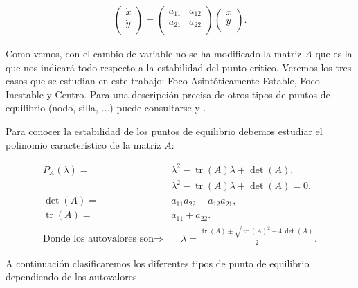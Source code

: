 \documentclass[12pt,a4paper]{report} %
\newcommand{\tr}{\operatorname{\textrm{tr}}}
\begin{document}
	\begin{eqnarray}
		\label{eq:trans3}
			\begin{pmatrix}
				\dot{x}\\
				\dot{y}\\
			\end{pmatrix} =
		   \begin{pmatrix}
				a_{11} & a_{12}\\
				a_{21} & a_{22}\\
			\end{pmatrix}
			\begin{pmatrix}
				x\\
				y\\
			\end{pmatrix}.
	\end{eqnarray} \smallskip
	
	\noindent Como vemos, con el cambio de variable no se ha modificado la matriz $A$ que es la que nos indicará todo respecto a la estabilidad del punto crítico. Veremos los tres casos que se estudian en este trabajo: Foco Asintóticamente Estable, Foco Inestable y Centro. Para una descripción precisa de otros tipos de puntos de equilibrio (nodo, silla, ...) puede consultarse \cite{perko} y \cite{simmons}.
	
	\vspace{0.5cm}\noindent Para conocer la estabilidad de los puntos de equilibrio debemos estudiar el polinomio característico de la matriz $A$:
	
	\begin{equation}
		\label{eq:equilibrio}
		\begin{aligned}
		P_A(\lambda)=&\lambda^2-\tr(A)\lambda+\det(A),\\[1mm]
		&\lambda^2-\tr(A)\lambda+\det(A)=0.\\[7mm]
		\det(A)=& a_{11}a_{22}-a_{12}a_{21},\\[1mm]
		\tr(A) =& a_{11}+a_{22}.\\[7mm]
		\text{Donde los autovalores son}\Longrightarrow& \quad \lambda=\frac{\tr(A)\pm \sqrt{\tr(A)^2-4\,\det(A)}}{2}.
	    \end{aligned}
	\end{equation}
	
	\vspace{0.5cm} A continuación clasificaremos los diferentes tipos de punto de equilibrio dependiendo de los autovalores

	\vspace{1cm}
	
\end{document}
